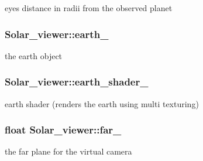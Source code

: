 eye\textquotesingle{}s distance in radii from the observed planet 

\subsubsection[{\texorpdfstring{earth\+\_\+}{earth_}}]{ Solar\+\_\+viewer\+::earth\+\_\+\hspace{0.3cm}{\ttfamily [private]}}\hypertarget{classSolar__viewer_a769d9e8775ba2106682964488117e695}{}\label{classSolar__viewer_a769d9e8775ba2106682964488117e695}


the earth object 

\subsubsection[{\texorpdfstring{earth\+\_\+shader\+\_\+}{earth_shader_}}]{ Solar\+\_\+viewer\+::earth\+\_\+shader\+\_\+\hspace{0.3cm}{\ttfamily [private]}}\hypertarget{classSolar__viewer_a5a423c2328fd2d79de95a2a270b385e3}{}\label{classSolar__viewer_a5a423c2328fd2d79de95a2a270b385e3}


earth shader (renders the earth using multi texturing) 

\subsubsection[{\texorpdfstring{far\+\_\+}{far_}}]{\setlength{\rightskip}{0pt plus 5cm}float Solar\+\_\+viewer\+::far\+\_\+\hspace{0.3cm}{\ttfamily [private]}}\hypertarget{classSolar__viewer_ae47e94d8d1b6ee4297454d6234531d87}{}\label{classSolar__viewer_ae47e94d8d1b6ee4297454d6234531d87}


the far plane for the virtual camera 

